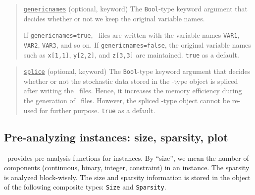 \begin{quote}
	\noindent\underline{\texttt{genericnames}} (optional, keyword) The \texttt{Bool}-type keyword argument that decides whether or not we keep the original variable names. 
	
	If \texttt{genericnames=true}, \smps\ files are written with the variable names \texttt{VAR1}, \texttt{VAR2}, \texttt{VAR3}, and so on. If \texttt{genericnames=false}, the original variable names such as \texttt{x[1,1]}, \texttt{y[2,2]}, and \texttt{z[3,3]} are maintained. \texttt{true} as a default.
\end{quote}

\begin{quote}
	\noindent\underline{\texttt{splice}} (optional, keyword) The \texttt{Bool}-type keyword argument that decides whether or not the stochastic data stored in the \jumpmodel-type object is spliced after writing the \smps\ files. Hence, it increases the memory efficiency during the generation of \smps\ files. However, the spliced \jumpmodel-type object cannot be re-used for further purpose. \texttt{true} as a default.
\end{quote}


%
%

\subsection{Pre-analyzing instances: size, sparsity, plot} \label{tutorial:analyze_instance}
\siplibjl\ provides pre-analysis functions for instances. By ``size'', we mean the number of components (continuous, binary, integer, constraint) in an instance. The sparsity is analyzed block-wisely. The size and sparsity information is stored in the object of the following composite types: \texttt{Size} and \texttt{Sparsity}.

